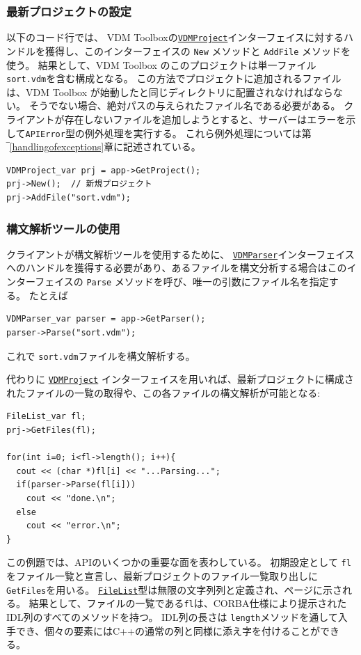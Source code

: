 \documentclass[\pformat,12pt]{jarticle}
\newcommand{\FileList}{\hyperlink{type.FileList}{FileList}}
\newcommand{\VDMParser}{\hyperlink{interface.VDMParser}{VDMParser}}
\newcommand{\VDMProject}{\hyperlink{interface.VDMProject}{VDMProject}}
\begin{document}
\subsubsection{最新プロジェクトの設定}

以下のコード行では、 VDM Toolboxの{\tt \VDMProject}インターフェイスに対するハンドルを獲得し、このインターフェイスの {\tt New} メソッドと {\tt AddFile} メソッドを使う。
結果として、VDM Toolbox のこのプロジェクトは単一ファイル {\tt sort.vdm}を含む構成となる。
この方法でプロジェクトに追加されるファイルは、VDM Toolbox が始動したと同じディレクトリに配置されなければならない。
そうでない場合、絶対パスの与えられたファイル名である必要がある。
クライアントが存在しないファイルを追加しようとすると、サーバーはエラーを示して{\tt APIError}型の例外処理を実行する。
これら例外処理については第‾\ref{handlingofexceptions}章に記述されている。

\begin{verbatim}
VDMProject_var prj = app->GetProject();
prj->New();  // 新規プロジェクト
prj->AddFile("sort.vdm");
\end{verbatim}

\subsubsection{構文解析ツールの使用}

クライアントが構文解析ツールを使用するために、 {\tt \VDMParser}インターフェイスへのハンドルを獲得する必要があり、あるファイルを構文分析する場合はこのインターフェイスの {\tt Parse} メソッドを呼び、唯一の引数にファイル名を指定する。
たとえば

\begin{verbatim}
VDMParser_var parser = app->GetParser();
parser->Parse("sort.vdm");
\end{verbatim}

これで {\tt sort.vdm}ファイルを構文解析する。

代わりに {\tt \VDMProject} インターフェイスを用いれば、最新プロジェクトに構成されたファイルの一覧の取得や、この各ファイルの構文解析が可能となる:

\begin{verbatim}
FileList_var fl;
prj->GetFiles(fl);

for(int i=0; i<fl->length(); i++){
  cout << (char *)fl[i] << "...Parsing...";
  if(parser->Parse(fl[i]))
    cout << "done.\n";
  else
    cout << "error.\n";
}
\end{verbatim}

この例題では、APIのいくつかの重要な面を表わしている。
初期設定として {\tt fl} をファイル一覧と宣言し、最新プロジェクトのファイル一覧取り出しに {\tt GetFiles}を用いる。
 {\tt \FileList}型は無限の文字列列と定義され、\pageref{ref:corbatypes}ページに示される。 
結果として、ファイルの一覧である{\tt fl}は、CORBA仕様\cite{OMG&96}により提示されたIDL列のすべてのメソッドを持つ。
IDL列の長さは {\tt length}メソッドを通して入手でき、個々の要素にはC++の通常の列と同様に添え字を付けることができる。
\end{document}
